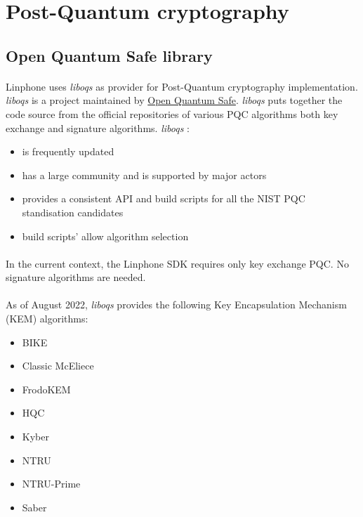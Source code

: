 \documentclass[a4paper,11pt]{article}
\begin{document}
\newpage
\section{Post-Quantum cryptography}
\subsection{Open Quantum Safe library}
\paragraph*{}Linphone uses  \textit{liboqs}\citep{liboqs} as provider for Post-Quantum cryptography implementation. \textit{liboqs} is a project maintained by \href{https://openquantumsafe.org/}{Open Quantum Safe}. \textit{liboqs} puts together the code source from the official repositories of various PQC algorithms both key exchange and signature algorithms. \textit{liboqs} :
\begin{itemize}
  \item is frequently updated
  \item has a large community and is supported by major actors
  \item provides a consistent API and build scripts for all the NIST PQC standisation candidates
  \item build scripts' allow algorithm selection
\end{itemize}

\paragraph*{}In the current context, the Linphone SDK requires only key exchange PQC. No signature algorithms are needed.

\paragraph*{}As of August 2022, \textit{liboqs} provides the following Key Encapsulation Mechanism (KEM) algorithms:
\begin{itemize}
  \item BIKE
  \item Classic McEliece
  \item FrodoKEM
  \item HQC
  \item Kyber
  \item NTRU
  \item NTRU-Prime
  \item Saber
\end{itemize}
\end{document}
